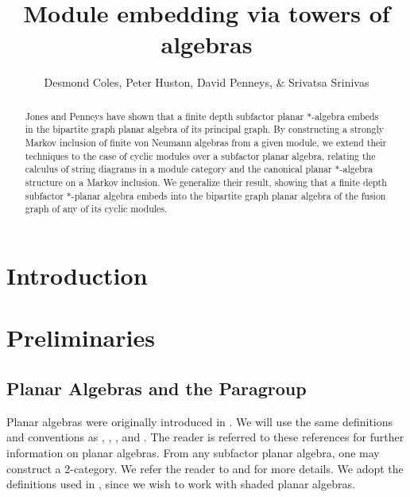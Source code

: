 \documentclass[11pt]{article}
\title{Module embedding via towers of algebras}
\author{Desmond Coles, Peter Huston, David Penneys, \& Srivatsa Srinivas}
\theoremstyle{plain}
\theoremstyle{definition}
\begin{document}

\maketitle
\begin{abstract}
Jones and Penneys have shown that a finite depth subfactor planar $*$-algebra embeds in the bipartite graph planar algebra of its principal graph. By constructing a strongly Markov inclusion of finite von Neumann algebras from a given module, we extend their techniques to the case of cyclic modules over a subfactor planar algebra, relating the calculus of string diagrams in a module category and the canonical planar $*$-algebra structure on a Markov inclusion. We generalize their result, showing that a finite depth subfactor $*$-planar algebra embeds into the bipartite graph planar algebra of the fusion graph of any of its cyclic modules. 
\end{abstract}
\section{Introduction}
\section{Preliminaries}
\subsection{Planar Algebras and the Paragroup}  \label{cattheory}
Planar algebras were originally introduced in \cite{planaralg1}. We will use the same definitions and conventions as \cite{penneys}, \cite{peters}, \cite{jones}, and \cite{planaralg2}. The reader is referred to these references for further information on planar algebras. From any subfactor planar algebra, one may construct a 2-category. We refer the reader to \cite{paragroup} and \cite{paragroup2} for more details. We adopt the definitions used in \cite{paragroup}, since we wish to work with shaded planar algebras.
\end{document}
